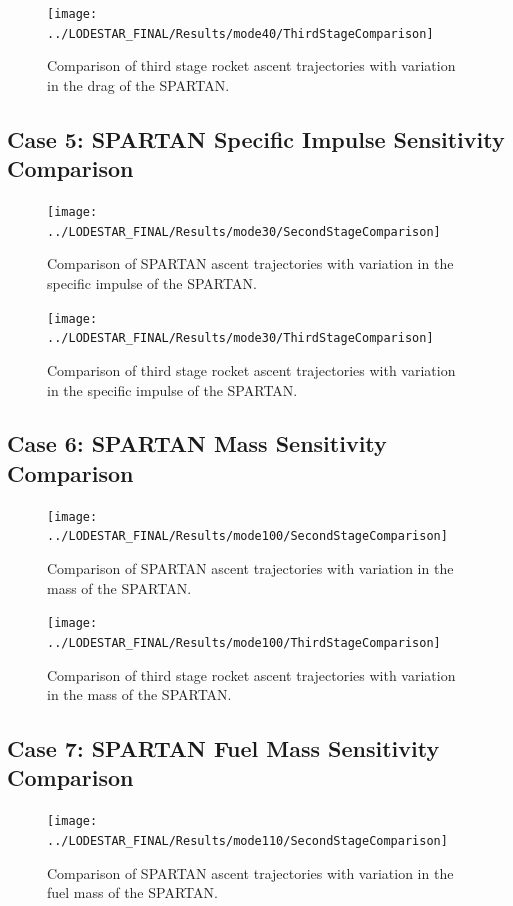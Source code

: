 \begin{figure}[!th]
\centering
\texttt{[image: ../LODESTAR\_FINAL/Results/mode40/ThirdStageComparison]}
\caption{Comparison of third stage rocket ascent trajectories with variation in the drag of the SPARTAN.}
\label{fig:ThirdStageComparison3}
\end{figure}
\FloatBarrier
\clearpage
\subsection{Case 5: SPARTAN Specific Impulse Sensitivity Comparison}\label{sec:app_comparison30}


\begin{figure}[!th]
	\centering
	\texttt{[image: ../LODESTAR\_FINAL/Results/mode30/SecondStageComparison]}
	\caption{Comparison of SPARTAN ascent trajectories with variation in the specific impulse of the SPARTAN.}
	\label{fig:SecondStageComparison2}
	
\end{figure}
\begin{figure}[!th]
	\centering
	\texttt{[image: ../LODESTAR\_FINAL/Results/mode30/ThirdStageComparison]}
	\caption{Comparison of third stage rocket ascent trajectories with variation in the specific impulse of the SPARTAN.}
	\label{fig:ThirdStageComparison2}
\end{figure}
\FloatBarrier
\clearpage
\subsection{Case 6: SPARTAN Mass Sensitivity Comparison}\label{sec:app_comparison100}

\begin{figure}[!th]
\centering
\texttt{[image: ../LODESTAR\_FINAL/Results/mode100/SecondStageComparison]}
\caption{Comparison of SPARTAN ascent trajectories with variation in the mass of the SPARTAN.}
\label{fig:SecondStageComparison4}
\end{figure}

\begin{figure}[!th]
\centering
\texttt{[image: ../LODESTAR\_FINAL/Results/mode100/ThirdStageComparison]}
\caption{Comparison of third stage rocket ascent trajectories with variation in the mass of the SPARTAN.}
\label{fig:ThirdStageComparison4}
\end{figure}
\FloatBarrier
\clearpage
\subsection{Case 7: SPARTAN Fuel Mass Sensitivity Comparison}\label{sec:app_comparison110}
\begin{figure}[!th]
\centering
\texttt{[image: ../LODESTAR\_FINAL/Results/mode110/SecondStageComparison]}
\caption{Comparison of SPARTAN ascent trajectories with variation in the fuel mass of the SPARTAN.}
\label{fig:SecondStageComparison5}
\end{figure}

